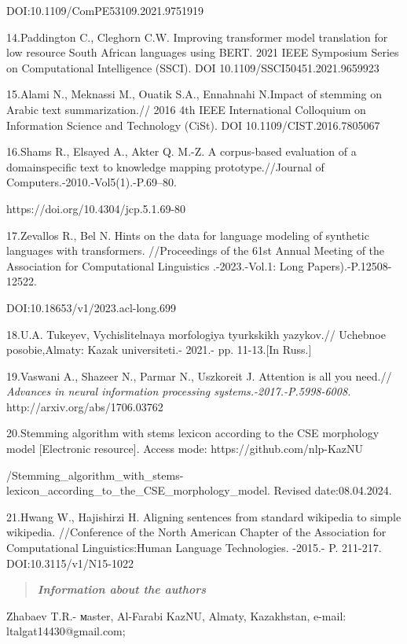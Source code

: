DOI:10.1109/ComPE53109.2021.9751919

14.Paddington C., Cleghorn C.W. Improving transformer model translation
for low resource South African languages using BERT. 2021 IEEE Symposium
Series on Computational Intelligence (SSCI). DOI
10.1109/SSCI50451.2021.9659923

15.Alami N., Meknassi M., Ouatik S.A., Ennahnahi N.Impact of stemming on
Arabic text summarization.// 2016 4th IEEE International Colloquium on
Information Science and Technology (CiSt). DOI 10.1109/CIST.2016.7805067

16.Shams R., Elsayed A., Akter Q. M.-Z. A corpus-based evaluation of a
domainspecific text to knowledge mapping prototype.//Journal of
Computers.-2010.-Vol5(1).-P.69--80.

https://doi.org/10.4304/jcp.5.1.69-80

17.Zevallos R., Bel N. Hints on the data for language modeling of
synthetic languages with transformers. //Proceedings of the 61st Annual
Meeting of the Association for Computational Linguistics .-2023.-Vol.1:
Long Papers).-P.12508-12522.

DOI:10.18653/v1/2023.acl-long.699

18.U.A. Tukeyev, Vychislitelnaya morfologiya tyurkskikh yazykov.//
Uchebnoe posobie,Almaty: Kazak universiteti.- 2021.- pp. 11-13.{[}In
Russ.{]}

19.Vaswani A., Shazeer N., Parmar N., Uszkoreit J. Attention is all you
need.// \emph{Advances in neural information processing
systems.-2017.-P.5998-6008.} http://arxiv.org/abs/1706.03762

20.Stemming algorithm with stems lexicon according to the CSE morphology
model {[}Electronic resource{]}. Access mode:
https://github.com/nlp-KazNU

/Stemming\_algorithm\_with\_stems-lexicon\_according\_to\_the\_CSE\_morphology\_model.
Revised date:08.04.2024.

\label{kix.87gpl39zxgv2}{}21.Hwang W., Hajishirzi H.
Aligning sentences from standard wikipedia to simple wikipedia.
//Conference of the North American Chapter of the Association for
Computational Linguistics:Human Language Technologies. -2015.- P.
211-217. DOI:10.3115/v1/N15-1022

\begin{quote}
\emph{\textbf{Information about the authors}}
\end{quote}

Zhabaev T.R.- мaster, Al-Farabi KazNU, Almaty, Kazakhstan, e-mail:
ltalgat14430@gmail.com;

